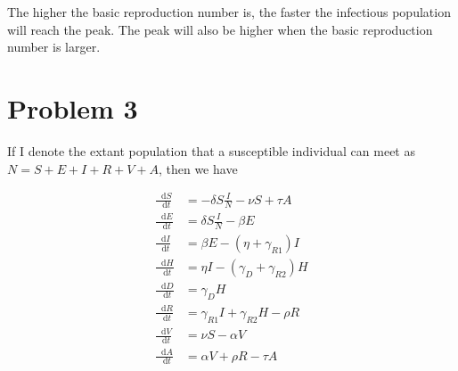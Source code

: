 \documentclass[12pt]{article}
\newcommand*\diff{\mathop{}\!\mathrm{d}}
\begin{document}
The higher the basic reproduction number is, the faster the infectious population will reach the peak. The peak will also be higher when the basic reproduction number is larger.

\section*{Problem 3}

If I denote the extant population that a susceptible individual can meet as $N = S+E+I+R+V+A$, then we have

\begin{align*}
	\frac{\diff S}{\diff t} &= -\delta S \frac{I}{N} - \nu S + \tau A\\
	\frac{\diff E}{\diff t} &= \delta S \frac{I}{N} - \beta E\\
	\frac{\diff I}{\diff t} &= \beta E - (\eta + \gamma_{R1})I \\
	\frac{\diff H}{\diff t} &= \eta I-(\gamma_{D}+\gamma_{R2})H \\
	\frac{\diff D}{\diff t} &= \gamma_{D} H\\
	\frac{\diff R}{\diff t} &= \gamma_{R1} I + \gamma_{R2} H - \rho R\\
	\frac{\diff V}{\diff t} &= \nu S - \alpha V\\
	\frac{\diff A}{\diff t} &= \alpha V+\rho R - \tau A
\end{align*}
\end{document}

